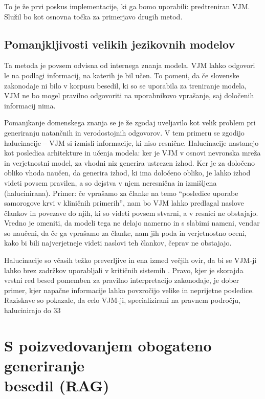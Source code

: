 \documentclass[a4paper,12pt,openright]{book}
\begin{document}
To je že prvi poskus implementacije, ki ga bomo uporabili: predtreniran VJM. Služil bo kot osnovna točka za primerjavo drugih metod.

\subsection{Pomanjkljivosti velikih jezikovnih modelov}

Ta metoda je povsem odvisna od internega znanja modela. VJM lahko odgovori le na podlagi informacij, na katerih je bil učen. To pomeni, da če slovenske zakonodaje ni bilo v korpusu besedil, ki so se uporabila za treniranje modela, VJM ne bo mogel pravilno odgovoriti na uporabnikovo vprašanje, saj določenih informacij nima.

Pomanjkanje domenskega znanja se je že zgodaj uveljavilo kot velik problem pri generiranju natančnih in verodostojnih odgovorov. V tem primeru se zgodijo halucinacije – VJM si izmisli informacije, ki niso resnične. Halucinacije nastanejo kot posledica arhitekture in učenja modela: ker je VJM v osnovi nevronska mreža in verjetnostni model, za vhodni niz generira ustrezen izhod. Ker je za določeno obliko vhoda naučen, da generira izhod, ki ima določeno obliko, je lahko izhod videti povsem pravilen, a so dejstva v njem neresnična in izmišljena (halucinirana). Primer: če vprašamo za članke na temo “posledice uporabe samorogove krvi v kliničnih primerih”, nam bo VJM lahko predlagal naslove člankov in povezave do njih, ki so videti povsem stvarni, a v resnici ne obstajajo. Vredno je omeniti, da modeli tega ne delajo namerno in s slabimi nameni, vendar so naučeni, da če ga vprašamo za članke, nam jih poda in verjetnostno oceni, kako bi bili najverjetneje videti naslovi teh člankov, čeprav ne obstajajo.

Halucinacije so včasih težko preverljive in ena izmed večjih ovir, da bi se VJM-ji lahko brez zadržkov uporabljali v kritičnih sistemih \cite{llm_hallucinations}. Pravo, kjer je skorajda vrstni red besed pomemben za pravilno interpretacijo zakonodaje, je dober primer, kjer napačne informacije lahko povzročijo velike in neprijetne posledice. Raziskave so pokazale, da celo VJM-ji, specializirani na pravnem področju, halucinirajo do 33\ %

\section{S poizvedovanjem obogateno generiranje\\besedil (RAG)}
\end{document}
